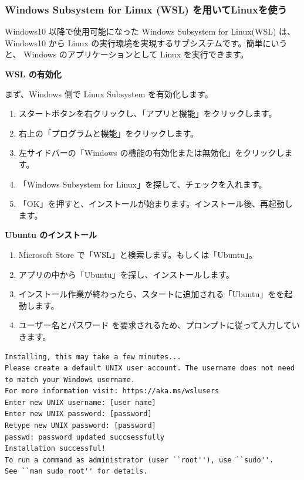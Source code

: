 \documentclass[uplatex,10pt,a4j]{jsarticle}
\begin{document}
\subsubsection{Windows Subsystem for Linux (WSL) を用いてLinuxを使う}
Windows10 以降で使用可能になった Windows Subsystem for Linux(WSL) は、 Windows10 から Linux の実行環境を実現するサブシステムです。簡単にいうと、 Windows のアプリケーションとして Linux を実行できます。

\vspace{1cm}
{\large \bf WSL の有効化}
\vspace{0.5cm}

まず、Windows 側で Linux Subsystem を有効化します。
\begin{enumerate}
  \item スタートボタンを右クリックし、「アプリと機能」をクリックします。
  \item 右上の「プログラムと機能」をクリックします。
  \item 左サイドバーの「Windows の機能の有効化または無効化」をクリックします。
  \item 「Windows Subsystem for Linux」を探して、チェックを入れます。
  \item 「OK」を押すと、インストールが始まります。インストール後、再起動します。
\end{enumerate}

\vspace{1cm}
{\large \bf Ubuntu のインストール}
\vspace{0.5cm}

\begin{enumerate}
  \item Microsoft Store で「WSL」と検索します。もしくは「Ubuntu」。
  \item アプリの中から「Ubuntu」を探し、インストールします。
  \item インストール作業が終わったら、スタートに追加される「Ubuntu」をを起動します。
  \item ユーザー名とパスワード を要求されるため、プロンプトに従って入力していきます。
\end{enumerate}
\begin{lstlisting}[caption=表示されるスクリプト例]
Installing, this may take a few minutes...
Please create a default UNIX user account. The username does not need to match your Windows username.
For more information visit: https://aka.ms/wslusers
Enter new UNIX username: [user name]
Enter new UNIX password: [password]
Retype new UNIX password: [password]
passwd: password updated succsessfully
Installation successful!
To run a command as administrator (user ``root''), use ``sudo''.
See ``man sudo_root'' for details.
\end{lstlisting}
\end{document}
